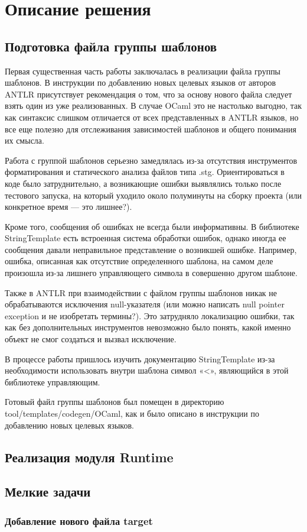 
\section{Описание решения}

\subsection{Подготовка файла группы шаблонов}
\label{subsec:string_template_group}

Первая существенная часть работы заключалась в реализации файла группы шаблонов. 
В инструкции по добавлению новых целевых языков от авторов ANTLR присутствует рекомендация о том, 
что за основу нового файла следует взять один из уже реализованных. 
В случае OCaml это не настолько выгодно, так как синтаксис слишком отличается от всех представленных в ANTLR языков, 
но все еще полезно для отслеживания зависимостей шаблонов и общего понимания их смысла. 

Работа с группой шаблонов серьезно замедлялась из-за отсутствия инструментов форматирования и статического анализа файлов типа .stg. 
Ориентироваться в коде было затруднительно, а возникающие ошибки выявлялись только после тестового запуска, на который уходило около 
полуминуты на сборку проекта (или конкретное время — это лишнее?).

Кроме того, сообщения об ошибках не всегда были информативны. 
В библиотеке StringTemplate есть встроенная система обработки ошибок, однако иногда ее сообщения давали неправильное представление 
о возникшей ошибке. 
Например, ошибка, описанная как отсутствие определенного шаблона, на самом деле произошла из-за лишнего управляющего символа 
в совершенно другом шаблоне. 

Также в ANTLR при взаимодействии с файлом группы шаблонов никак не обрабатываются исключения null-указателя 
(или можно написать null pointer exception и не изобретать термины?). 
Это затрудняло локализацию ошибки, так как без дополнительных инструментов невозможно было понять, какой именно объект 
не смог создаться и вызвал исключение. 

В процессе работы пришлось изучить документацию StringTemplate из-за необходимости использовать внутри шаблона символ «<», 
являющийся в этой библиотеке управляющим. 

Готовый файл группы шаблонов был помещен в директорию tool/templates/codegen/OCaml, как и было описано в инструкции 
по добавлению новых целевых языков.

\subsection{Реализация модуля Runtime}
\label{subsec:runtime_realization}

\subsection{Мелкие задачи}
\label{subsec:misc}
\subsubsection{Добавление нового файла target}

